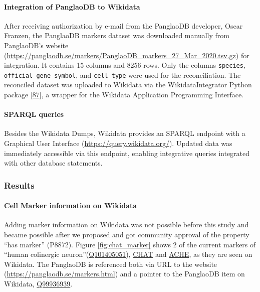 \hypertarget{integration-of-panglaodb-to-wikidata}{%
\paragraph{Integration of PanglaoDB to Wikidata}\label{integration-of-panglaodb-to-wikidata}}

After receiving authorization by e-mail from the PanglaoDB developer, Oscar Franzen, the PanglaoDB markers dataset was downloaded manually from PanglaoDB's website (\url{https://panglaodb.se/markers/PanglaoDB_markers_27_Mar_2020.tsv.gz}) for integration. It contains 15 columns and 8256 rows. Only the columns \texttt{species}, \texttt{official\ gene\ symbol}, and \texttt{cell\ type} were used for the reconciliation.
The reconciled dataset was uploaded to Wikidata via the WikidataIntegrator Python package {[}\protect\hyperlink{ref-qDI8I4IJ}{87}{]}, a wrapper for the Wikidata Application Programming Interface.

\hypertarget{sparql-queries}{%
\paragraph{SPARQL queries}\label{sparql-queries}}

Besides the Wikidata Dumps, Wikidata provides an SPARQL endpoint with a Graphical User Interface (\url{https://query.wikidata.org/}).
Updated data was immediately accessible via this endpoint, enabling integrative queries integrated with other database statements.

\hypertarget{results}{%
\subsubsection{Results}\label{results}}

\hypertarget{cell-marker-information-on-wikidata}{%
\paragraph{Cell Marker information on Wikidata}\label{cell-marker-information-on-wikidata}}

Adding marker information on Wikidata was not possible before this study and became possible after we proposed and got community approval of the property ``has marker'' (P8872).
Figure \ref{fig:chat_marker} shows 2 of the current markers of ``human colinergic neuron''(\href{http://www.wikidata.org/entity/Q101405051}{Q101405051}), \href{http://www.wikidata.org/entity/Q14863671}{CHAT} and \href{http://www.wikidata.org/entity/Q407983}{ACHE}, as they are seen on Wikidata.
The PanglaoDB is referenced both via URL to the website (\url{https://panglaodb.se/markers.html}) and a pointer to the PanglaoDB item on Wikidata, \href{http://www.wikidata.org/entity/Q99936939}{Q99936939}.

